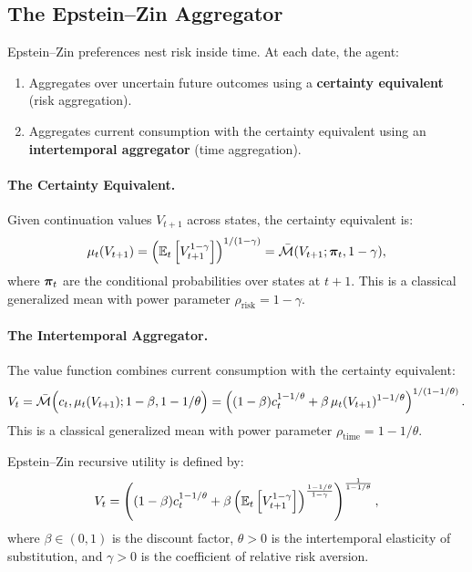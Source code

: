 \subsection{The Epstein--Zin Aggregator}
\label{subsec:ez-aggregator}

Epstein--Zin preferences nest risk inside time. At each date, the agent:
\begin{enumerate}[leftmargin=2em]
    \item Aggregates over uncertain future outcomes using a \textbf{certainty equivalent} (risk aggregation).
    \item Aggregates current consumption with the certainty equivalent using an \textbf{intertemporal aggregator} (time aggregation).
\end{enumerate}

\paragraph{The Certainty Equivalent.}
Given continuation values $V_{t+1}$ across states, the certainty equivalent is:
\begin{equation}
\mu_t(V_{t+1}) = \left( \mathbb{E}_t \left[ V_{t+1}^{1-\gamma} \right] \right)^{1/(1-\gamma)} = \bar{\mathcal{M}}(V_{t+1}; \bm{\pi}_t, 1-\gamma),
\label{eq:ez-ce}
\end{equation}
where $\bm{\pi}_t$ are the conditional probabilities over states at $t+1$. This is a classical generalized mean with power parameter $\rho_{\text{risk}} = 1 - \gamma$.

\paragraph{The Intertemporal Aggregator.}
The value function combines current consumption with the certainty equivalent:
\begin{equation}
V_t = \bar{\mathcal{M}}\Big( c_t, \mu_t(V_{t+1}); 1-\beta, 1-1/\theta \Big) = \left( (1-\beta) c_t^{1-1/\theta} + \beta \, \mu_t(V_{t+1})^{1-1/\theta} \right)^{1/(1-1/\theta)}.
\label{eq:ez-aggregator}
\end{equation}
This is a classical generalized mean with power parameter $\rho_{\text{time}} = 1 - 1/\theta$.

\begin{definition}
\label{def:epstein-zin}
Epstein--Zin recursive utility is defined by:
\begin{equation}
V_t = \left( (1-\beta) c_t^{1-1/\theta} + \beta \left( \mathbb{E}_t \left[ V_{t+1}^{1-\gamma} \right] \right)^{\frac{1-1/\theta}{1-\gamma}} \right)^{\frac{1}{1-1/\theta}},
\end{equation}
where $\beta \in (0,1)$ is the discount factor, $\theta > 0$ is the intertemporal elasticity of substitution, and $\gamma > 0$ is the coefficient of relative risk aversion.
\end{definition}

